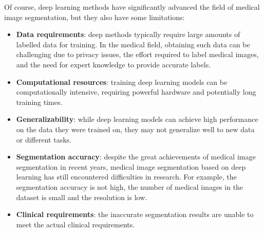 Of course, deep learning methods have significantly advanced the field of medical image segmentation, but they also have some limitations:
\begin{itemize}
    \item \textbf{Data requirements}: deep methods typically require large amounts of labelled data for training. In the medical field, obtaining such data can be challenging due to privacy issues, the effort required to label medical images, and the need for expert knowledge to provide accurate labels.
    \item \textbf{Computational resources}: training deep learning models can be computationally intensive, requiring powerful hardware and potentially long training times.
    \item \textbf{Generalizability}: while deep learning models can achieve high performance on the data they were trained on, they may not generalize well to new data or different tasks.
    \item \textbf{Segmentation accuracy}: despite the great achievements of medical image segmentation in recent years, medical image segmentation based on deep learning has still encountered difficulties in research. For example, the segmentation accuracy is not high, the number of medical images in the dataset is small and the resolution is low.
    \item \textbf{Clinical requirements}: the inaccurate segmentation results are unable to meet the actual clinical requirements.
\end{itemize}


